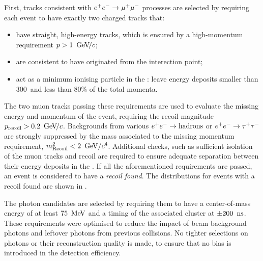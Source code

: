 First, tracks consistent with $e^+e^-\rightarrow\mu^+\mu^-$ processes are selected by requiring each event to have exactly two charged tracks that:
\begin{itemize}
    \item have straight, high-energy tracks, which is ensured by a high-momentum requirement $p>1~{\mathrm{\,Ge\kern -0.1em V\!/}c}$;
    \item are consistent to have originated from the interection point;
    \item act as a minimum ionising particle in the \ECL: leave energy deposits smaller than 300~\mev and less than 80\% of the total momenta.
\end{itemize}
The two muon tracks passing these requirements are used to evaluate the missing energy and momentum of the event, requiring the recoil magnitude $p_{\mathrm{recoil}}>0.2~{\mathrm{\,Ge\kern -0.1em V\!/}c}$.
Backgrounds from various $e^+e^-\rightarrow\mathrm{hadrons}$ or $e^+e^-\rightarrow\tau^+\tau^-$ are strongly suppressed by the mass associated to the missing momentum requirement,
$m^2_{\mathrm{Recoil}}<2~\mathrm{\,Ge\kern -0.1em V}/c^4$. 
Additional checks, such as sufficient isolation of the muon tracks and recoil are required to ensure adequate separation between their energy deposits in the \ECL.
If all the aforementioned requirements are passed, an event is considered to have a \textit{recoil found}.
The distributions for events with a recoil found are shown in .

The photon candidates are selected by requiring them to have a center-of-mass energy of at least $75~\mathrm{\,Me\kern -0.1em V}$ and a timing of the associated cluster at $\pm200~{\rm \,ns}$.
These requirements were optimised to reduce the impact of beam background photons and leftover photons from previous collisions.
No tighter selections on photons or their reconstruction quality is made, to ensure that no bias is introduced in the detection efficiency.

